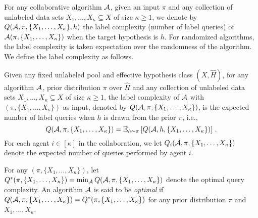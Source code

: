 For any collaborative algorithm $\mathcal{A}$, given an input $\pi$ and any collection of unlabeled data sets $X_1,\ldots,X_\kappa\subseteq X$ of size $\kappa\geq 1$, we denote by $Q(\mathcal{A},\pi,\{X_1,\ldots,X_\kappa\}, h)$ the label complexity (number of label queries) of $\mathcal{A}(\pi,\{X_1,\ldots,X_\kappa\})$ when the target hypothesis is $h$. 
For randomized algorithms, the label complexity is taken expectation over the randomness of the algorithm. 
We define the label complexity as follows.
\begin{definition} 
Given any fixed unlabeled pool and effective hypothesis class $(X,\hat H)$, for any algorithm $\mathcal{A}$, prior distribution $\pi$ over $\hat H$ and any collection of unlabeled data sets $X_1,\ldots,X_\kappa\subseteq X$ of size $\kappa\geq 1$, 
the label complexity of $\mathcal{A}$ with $(\pi, \{X_1,\ldots,X_\kappa\})$ as input, denoted by $Q(\mathcal{A},\pi, \{X_1,\ldots,X_\kappa\})$, is the expected number of label queries when $h$ is drawn from the prior $\pi$, i.e.,
    \[Q(\mathcal{A}, \pi, \{X_1,\ldots,X_\kappa\}) = \mathbb{E}_{h\sim \pi}\left[Q(\mathcal{A}, h, \{X_1,\ldots,X_\kappa\})\right]\,.\]
    For each agent $i\in [\kappa]$ in the collaboration, we let $Q_i(\mathcal{A}, \pi, \{X_1,\ldots,X_\kappa\})$ denote the expected number of queries performed by agent $i$.
\end{definition}
For any $(\pi, \{X_1,\ldots,X_\kappa\})$, let $Q^*(\pi, \{X_1,\ldots,X_\kappa\})=\min_{\mathcal{A}} Q(\mathcal{A},\pi, \{X_1,\ldots,X_\kappa\})$ denote the optimal query complexity.
An algorithm $\mathcal{A}$ is said to be \textit{optimal} if $Q(\mathcal{A}, \pi,\{X_1,\ldots,X_\kappa\}) = Q^*(\pi, \{X_1,\ldots,X_\kappa\})$ for any prior distribution $\pi$ and $X_1,\ldots,X_\kappa$.

